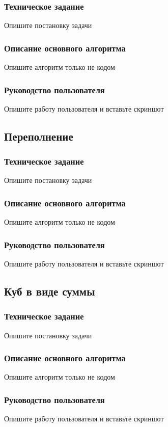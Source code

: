 \documentclass[a4paper,14pt]{extarticle}
\begin{document}
\subsubsection{Техническое задание}
Опишите постановку задачи

\subsubsection{Описание основного алгоритма}
Опишите алгоритм только не кодом

\subsubsection{Руководство пользователя}
Опишите работу пользователя и вставьте скриншот

\subsection{Переполнение}
\subsubsection{Техническое задание}
Опишите постановку задачи

\subsubsection{Описание основного алгоритма}
Опишите алгоритм только не кодом

\subsubsection{Руководство пользователя}
Опишите работу пользователя и вставьте скриншот

\subsection{Куб в виде суммы}
\subsubsection{Техническое задание}
Опишите постановку задачи

\subsubsection{Описание основного алгоритма}
Опишите алгоритм только не кодом

\subsubsection{Руководство пользователя}
Опишите работу пользователя и вставьте скриншот
\end{document}
